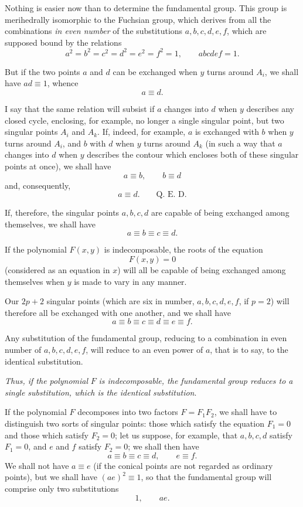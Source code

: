 \documentclass{article}
\begin{document}
Nothing is easier now than to determine the fundamental group. This group is merihedrally isomorphic to the Fuchsian group, which derives from all the combinations \emph{in even number} of the substitutions $a, b, c, d, e, f$, which are supposed bound by the relations
\[ a^{2} = b^{2} = c^{2} = d^{2} = e^{2} = f^{2} = 1, \qquad abcdef = 1. \]

But if the two points $a$ and $d$ can be exchanged when $y$ turns around $A_{i}$, we shall have $ad \equiv 1$, whence
\[ a \equiv d. \]

I say that the same relation will subsist if $a$ changes into $d$ when $y$ describes any closed cycle, enclosing, for example, no longer a single singular point, but two singular points $A_{i}$ and $A_{k}$. If, indeed, for example, $a$ is exchanged with $b$ when $y$ turns around $A_{i}$, and $b$ with $d$ when $y$ turns around $A_{k}$ (in such a way that $a$ changes into $d$ when $y$ describes the contour which encloses both of these singular points at once), we shall have
\[ a \equiv b, \qquad b \equiv d \]
and, consequently,
\[ a \equiv d. \qquad \text{Q.~E.~D.} \]

If, therefore, the singular points $a, b, c, d$ are capable of being exchanged among themselves, we shall have
\[ a \equiv b \equiv c \equiv d. \]


If the polynomial $F(x, y)$ is indecomposable, the roots of the equation
\[ F(x, y) = 0 \]
(considered as an equation in $x$) will all be capable of being exchanged among themselves when $y$ is made to vary in any manner.

Our $2p + 2$ singular points (which are six in number, $a, b, c, d, e, f$, if $p = 2$) will therefore all be exchanged with one another, and we shall have
\[ a \equiv b \equiv c \equiv d \equiv e \equiv f. \]

Any substitution of the fundamental group, reducing to a combination in even number of $a, b, c, d, e, f$, will reduce to an even power of $a$, that is to say, to the identical substitution.

\emph{Thus, if the polynomial} $F$ \emph{is indecomposable, the fundamental group reduces to a single substitution, which is the identical substitution}.

If the polynomial $F$ decomposes into two factors $F = F_{1}F_{2}$, we shall have to distinguish two sorts of singular points: those which satisfy the equation $F_{1} = 0$ and those which satisfy $F_{2} = 0$; let us suppose, for example, that $a, b, c, d$ satisfy $F_{1} = 0$, and $e$ and $f$ satisfy $F_{2} = 0$; we shall then have
\[ a \equiv b \equiv c \equiv d, \qquad e \equiv f. \]
We shall not have $a \equiv e$ (if the conical points are not regarded as ordinary points), but we shall have $(ae)^{2} \equiv 1$, so that the fundamental group will comprise only two substitutions
\[ 1, \qquad ae. \]
\end{document}
